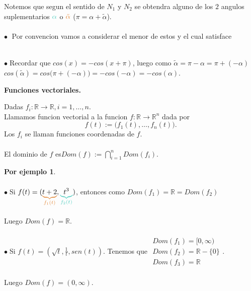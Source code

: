 \documentclass{article}
\theoremstyle{definition}
\theoremstyle{definition}
\newtheorem*{ej}{Por ejemplo}
\theoremstyle{remark}
\newcommand\bl{$\bullet\;$}
\begin{document}
\begin{figure}[h]
\centering
\def\svgwidth{1\textwidth}

\end{figure}
Notemos que segun el sentido de $N_1$ y $N_2$ se obtendra alguno de los $2$ angulos suplementarios $\textcolor{verdep2}{\alpha}$ o $\textcolor{rojop2}{\tilde{\alpha}}$ \big($\pi = \alpha + \tilde{\alpha}$\big).
\\\\ \textcolor{rojop2}{\bl} Por convencion vamos a considerar el menor de estos y el cual satisface \\
\begin{figure}[h]
\centering
\def\svgwidth{1\textwidth}

\end{figure} \\
\bl Recordar que $cos(x)=-cos(x+\pi)$, luego como $\tilde{\alpha}=\pi-\alpha=\pi+(-\alpha)$ \\ $cos(\tilde{\alpha})=cos\big(\pi+(-\alpha)\big)=-cos(-\alpha)=-cos(\alpha)$. 
\pagebreak
\begin{center}
\textbf{Funciones vectoriales.}
\end{center}
\begin{defi}
  Dadas $f_i : \mathbb{R} \to \mathbb{R}, i=1,\dots, n$.\\Llamamos funcion vectorial a la funcion $f: \mathbb{R} \to \mathbb{R}^n$ dada por $$f(t) := \big(f_1(t),\dots, f_n(t)\big).$$ Los $f_i$ se llaman funciones coordenadas de $f$. \\\\ El dominio de $f$ es\quad \quad  $    Dom(f) := \bigcap_{i=1}^{n} Dom(f_i)$.
\end{defi}
\begin{ej}
\; \\
\\ \bl Si $f(t)=(\textcolor{rojop2}{\underbrace{\textcolor{black}{t+2}}_{f_1(t)}},\textcolor{verdep2}{\underbrace{\textcolor{black}{t^3}}_{f_2(t)}})$, entonces como $Dom(f_1)=\mathbb{R}=Dom(f_2)$ \\ \\ Luego \quad $Dom(f)=\mathbb{R}$. \\\\
\bl Si $f(t)=\left(\sqrt{t},\frac{1}{t},sen(t)\right)$. Tenemos que $\begin{array}{l}Dom(f_1)=[0,\infty) \\ Dom(f_2)=\mathbb{R}-\{0\}\\ Dom(f_3)=\mathbb{R}\end{array}$.\\\\ Luego $Dom(f)=(0,\infty)$.

\end{ej}
\end{document}
